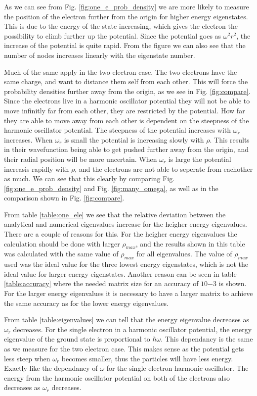 \documentclass[%
 reprint,
nofootinbib,
aps,
]{revtex4-1}
\begin{document}
As we can see from Fig. \vref{fig:one_e_prob_density} we are more likely to measure the position of the electron further from the origin for higher energy eigenstates. This is due to the energy of the state increasing, which gives the electron the possibility to climb further up the potential. Since the potential goes as $\omega^2r^2$, the increase of the potential is quite rapid. From the figure we can also see that the number of nodes increases linearly with the eigenstate number.

Much of the same apply in the two-electron case. The two electrons have the same charge, and want to distance them self from each other. This will force the probability densities further away from the origin, as we see in Fig. \ref{fig:compare}. Since the electrons live in a harmonic oscillator potential they will not be able to move infinitly far from each other, they are restricted by the potential. How far they are able to move away from each other is dependent on the steepness of the harmonic oscillator potential. The steepness of the potential increases with $\omega_r$ increases. When $\omega_r$ is small the potential is increasing slowly with $\rho$. This results in their wavefunction being able to get pushed further away from the origin, and their radial position will be more uncertain. When $\omega_r$ is large the potential increasis rapidly with $\rho$, and the electrons are not able to seperate from eachother as much. We can see that this clearly by comparing Fig. \ref{fig:one_e_prob_density} and Fig. \ref{fig:many_omega}, as well as in the comparison shown in Fig. \ref{fig:compare}. \par

From table \vref{table:one_ele} we see that the relative deviation between the analytical and numerical eigenvalues increase for the heigher energy eigenvalues. There are a couple of reasons for this. For the heigher energy eigenvalues the calculation should be done with larger $\rho_{max}$, and the results shown in this table was calculated with the same value of $\rho_{max}$ for all eigenvalues. The value of $\rho_{max}$ used was the ideal value for the three lowest energy eigenstates, which is not the ideal value for larger energy eigenstates. Another reason can be seen in table \ref{table:accuracy} where the needed matrix size for an accuracy of $10{-3}$ is shown. For the larger energy eigenvalues it is necessary to have a larger matrix to achieve the same accuracy as for the lower energy eigenvalues.

From table \vref{table:eigenvalues} we can tell that the energy eigenvalue decreases as $\omega_r$ decreases. For the single electron in a harmonic oscillator potential, the energy eigenvalue of the ground state is proportional to $\hbar \omega$. This dependancy is the same as we measure for the two electron case. This makes sense as the potential gets less steep when $\omega_r$ becomes smaller, thus the particles will have less energy. Exactly like the dependancy of $\omega$ for the single electron harmonic oscillator. The energy from the harmonic oscillator potential on both of the electrons also decreases as $\omega_r$ decreases.
\end{document}
